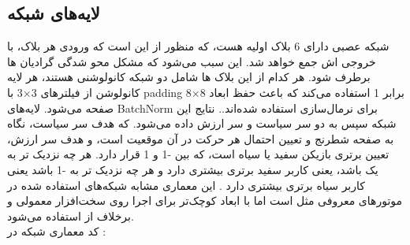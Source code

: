 \documentclass[12pt,a4paper]{article}
\begin{document}
	\subsection{لایه‌های شبکه }
	شبکه عصبی دارای 6 بلاک اولیه 
هست، که منظور از 
این است که ورودی هر بلاک، با خروجی اش جمع خواهد شد\citep{resNet}. این سبب می‌شود که مشکل محو شدگی گرادیان ها برطرف شود.
هر کدام از این بلاک ها شامل دو شبکه کانولوشنی 
هستند، هر لایه کانولوشن از فیلترهای 3×3 با padding
برابر 1 استفاده می‌کند که باعث حفظ ابعاد 8×8 صفحه می‌شود. لایه‌های BatchNorm برای نرمال‌سازی استفاده شده‌اند.. نتایج این شبکه سپس به دو سر سیاست
و سر ارزش
داده می‌شود. که هدف سر سیاست، نگاه به صفحه شطرنج و تعیین احتمال هر حرکت در آن موقعیت است، و هدف سر ارزش، تعیین برتری بازیکن سفید یا سیاه است، که بین -1 و 1 قرار دارد. هر چه نزدیک تر به یک باشد، یعنی کاربر سفید برتری بیشتری دارد و هر چه نزدیک تر به -1 باشد یعنی کاربر سیاه برتری بیشتری دارد
. این معماری مشابه شبکه‌های استفاده شده در موتورهای معروفی مثل 
 است اما با ابعاد کوچک‌تر برای اجرا روی سخت‌افزار معمولی و برخلاف 
از 
استفاده می‌شود.
\\
کد معماری شبکه در 
:
\end{document}
